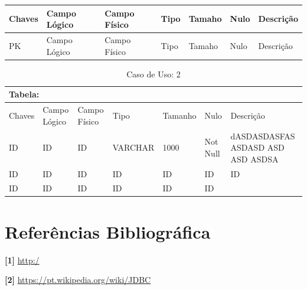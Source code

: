 \documentclass[12pt,a4paper]{article}
\begin{document}
\begin{center}

\begin{tabular}{|p{2cm}|p{2cm}|p{2cm}|p{2cm}|p{2cm}|p{2cm}|p{2cm}|}
\hline 
Chaves & Campo Lógico & Campo Físico & Tipo & Tamaho & Nulo & Descrição\\
\hline 
PK & Campo Lógico & Campo Físico & Tipo & Tamaho & Nulo & Descrição\\
\hline 

\end{tabular} 
\end{center}

\begin{center}


\begin{table}[h!]
		\caption{Caso de Uso: 2}
		\label{tabela:1}
		\begin{tabular}{|p{1cm}|p{2cm}|p{2cm}|p{1cm}|p{1.5cm}|p{2cm}|p{3cm}|}
		\hline
		
				
			\multicolumn{7}{|p{16cm}|}{\cellcolor{cinzaClaro} Tabela: } \\ 
			\hline
		{\small Chaves} & {\small Campo Lógico} & {\small Campo Físico} & {\small Tipo} & {\small Tamanho} & {\small Nulo} & {\small Descrição}\\
\hline 
		
		{\small ID} & {\small ID} & {\small ID} & {\small VARCHAR} & {\small 1000} & {\small Not Null} & {\small dASDASDASFAS ASDASD ASD ASD ASDSA} \\\hline 		
		
		{\small ID} & {\small ID} & {\small ID} & {\small ID} & {\small ID} & {\small ID} & {\small ID} \\\hline 
		ID & {\small ID} & {\footnotesize ID} & {\scriptsize ID} & {\tiny ID} & ID &
			
		\end{tabular}
	\end{table}
	
	\end{center}

\newpage
\section{Referências Bibliográfica}
\noindent \textbf{[1]} \url {http:/}\\\vspace{0.2cm}

\noindent \textbf{[2] }\url{https://pt.wikipedia.org/wiki/JDBC}\\\vspace{0.2cm}
\end{document}
